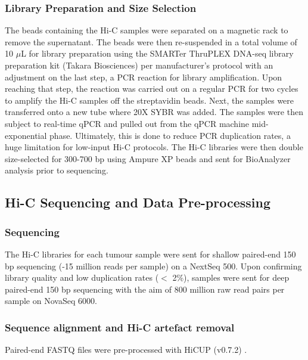 \subsubsection{Library Preparation and Size Selection}

The beads containing the Hi-C samples were separated on a magnetic rack to remove the supernatant.
The beads were then re-suspended in a total volume of 10 $\mu$L for library preparation using the SMARTer ThruPLEX DNA-seq library preparation kit (Takara Biosciences) per manufacturer's protocol with an adjustment on the last step, a PCR reaction for library amplification.
Upon reaching that step, the reaction was carried out on a regular PCR for two cycles to amplify the Hi-C samples off the streptavidin beads.
Next, the samples were transferred onto a new tube where 20X SYBR was added.
The samples were then subject to real-time qPCR and pulled out from the qPCR machine mid-exponential phase.
Ultimately, this is done to reduce PCR duplication rates, a huge limitation for low-input Hi-C protocols.
The Hi-C libraries were then double size-selected for 300-700 bp using Ampure XP beads and sent for BioAnalyzer analysis prior to sequencing.

\subsection{Hi-C Sequencing and Data Pre-processing}

\subsubsection{Sequencing}

The Hi-C libraries for each tumour sample were sent for shallow paired-end 150 bp sequencing (-15 million reads per sample) on a NextSeq 500.
Upon confirming library quality and low duplication rates ($<$ 2\%), samples were sent for deep paired-end 150 bp sequencing with the aim of 800 million raw read pairs per sample on NovaSeq 6000.

\subsubsection{Sequence alignment and Hi-C artefact removal}

Paired-end FASTQ files were pre-processed with HiCUP (v0.7.2) \cite{wingettHiCUPPipelineMapping2015}.

